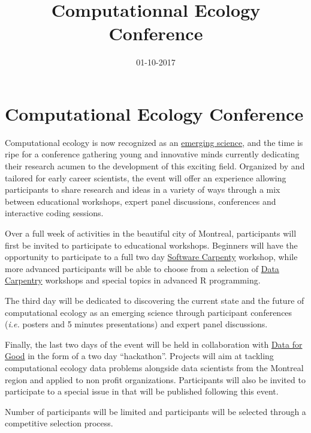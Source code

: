 \documentclass[10pt,english,]{article}
\title{Computationnal Ecology Conference}
\author{}
\date{01-10-2017}
\begin{document}
\maketitle

\section{Computational Ecology
Conference}\label{computational-ecology-conference}

Computational ecology is now recognized as an
\href{http://rsfs.royalsocietypublishing.org/content/2/2/241}{emerging
science}, and the time is ripe for a conference gathering young and
innovative minds currently dedicating their research acumen to the
development of this exciting field. Organized by and tailored for early
career scientists, the event will offer an experience allowing
participants to share research and ideas in a variety of ways through a
mix between educational workshops, expert panel discussions, conferences
and interactive coding sessions.

Over a full week of activities in the beautiful city of Montreal,
participants will first be invited to participate to educational
workshops. Beginners will have the opportunity to participate to a full
two day \href{https://software-carpentry.org/}{Software Carpenty}
workshop, while more advanced participants will be able to choose from a
selection of \href{http://www.datacarpentry.org/}{Data Carpentry}
workshops and special topics in advanced R programming.

The third day will be dedicated to discovering the current state and the
future of computational ecology as an emerging science through
participant conferences (\emph{i.e.} posters and 5 minutes
presentations) and expert panel discussions.

Finally, the last two days of the event will be held in collaboration
with
\href{https://www.meetup.com/DataforGood-Montreal/?_cookie-check=FowCtx-gNWyZzv7X}{Data
for Good} in the form of a two day ``hackathon''. Projects will aim at
tackling computational ecology data problems alongside data scientists
from the Montreal region and applied to non profit organizations.
Participants will also be invited to participate to a special issue in
that will be published following this event.

Number of participants will be limited and participants will be selected
through a competitive selection process.
\end{document}
